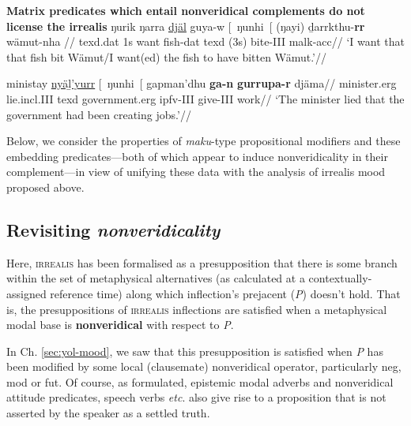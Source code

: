 \pex{} \textbf{Matrix predicates which entail nonveridical complements do not license the irrealis}
\a\begingl\gla ŋurik ŋarra \ul{djäl} guya-w \textup{[}~ŋunhi~\textup{[} (ŋayi)  ḏarrkthu-\textbf{rr} wämut-nha \nogloss{\textup{]]}}//
\glb \gls{texd}.\gls{dat} 1s want fish-\gls{dat} \gls{texd} (3s) bite-\gls{III} \gls{malk}-\gls{acc}//
\glft`I want that that fish bit Wämut/I want(ed) the fish to have bitten Wämut.'//\endgl

\a\begingl\gla ministay \ul{nyäḻ'yurr} \textup{[}~ŋunhi~\textup{[} gapman'dhu \textbf{ga-n} \textbf{gurrupa-r} djäma//
\glb minister.\gls{erg} lie.\gls{incl}.\gls{III} \gls{texd} government.\gls{erg} \gls{ipfv}-\gls{III} give-\gls{III} work//
\glft`The minister lied that the government had been creating jobs.'\trailingcitation{[AW~20190428]}//\endgl
\xe

Below, we consider the properties of \textit{maku}-type propositional modifiers and these embedding predicates---both of which appear to induce nonveridicality in their complement---in view of unifying these data with the analysis of irrealis mood proposed above.


\subsection{Revisiting \textit{nonveridicality}}



Here, \textsc{irrealis} has been formalised as a presupposition that there is some branch within the set of metaphysical alternatives (as calculated at a contextually-assigned reference time) along which inflection's prejacent (\textit{P}) doesn't hold. That is, the presuppositions of \textsc{irrealis} inflections are satisfied when a metaphysical modal base is \textbf{nonveridical} with respect to \textit{P}.

In Ch. \ref{sec:yol-mood}, we saw that this presupposition is satisfied when \textit{P} has been modified by some local (clausemate) nonveridical operator, particularly \gls{neg}, \gls{mod} or \gls{fut}. Of course, as formulated, epistemic modal adverbs and nonveridical attitude predicates, speech verbs \textit{etc}. also give rise to a proposition that is not asserted by the speaker as a settled truth.

